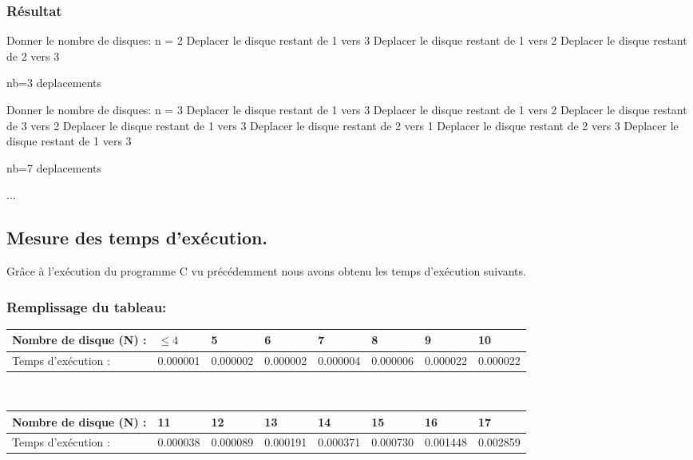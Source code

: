 \documentclass[12pt]{article}
\begin{document}
\subsubsection{Résultat}
\begin{sql}
Donner le nombre de disques: n = 2
Deplacer le disque restant de 1 vers 3
Deplacer le disque restant de 1 vers 2
Deplacer le disque restant de 2 vers 3

 nb=3 deplacements


Donner le nombre de disques: n = 3
Deplacer le disque restant de 1 vers 3
Deplacer le disque restant de 1 vers 2
Deplacer le disque restant de 3 vers 2
Deplacer le disque restant de 1 vers 3
Deplacer le disque restant de 2 vers 1
Deplacer le disque restant de 2 vers 3
Deplacer le disque restant de 1 vers 3

 nb=7 deplacements
 
 ...
\end{sql}

\subsection{Mesure des temps d'exécution.}
Grâce à l'exécution du programme C vu précédemment nous avons obtenu les temps d'exécution suivants.

\subsubsection{Remplissage du tableau:}
\color{blue}

\begin{tabular}{|p{3cm}||p{1.7cm}|p{1.7cm}|p{1.7cm}|p{1.7cm}|p{1.7cm}|p{1.7cm}|p{1.7cm}|}
\hline
Nombre de disque (N) : & $\le 4 $ & 5 & 6 & 7 & 8 & 9 & 10  \\
\hline
Temps d'exécution : & 0.000001 & 0.000002 & 0.000002 & 0.000004 & 0.000006 & 0.000022  & 0.000022\\
\hline

\end{tabular}
\\

\begin{tabular}{|p{3cm}||p{1.7cm}|p{1.7cm}|p{1.7cm}|p{1.7cm}|p{1.7cm}|p{1.7cm}|p{1.7cm}|}
\hline
Nombre de disque (N) : & 11 & 12 & 13 & 14 & 15 & 16 & 17  \\
\hline
Temps d'exécution :  & 0.000038 & 0.000089 & 0.000191 & 0.000371 & 0.000730 & 0.001448 & 0.002859 \\
\hline

\end{tabular}
\\
\end{document}
